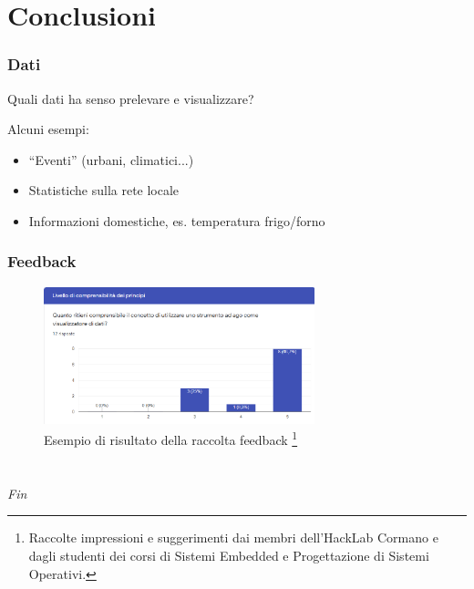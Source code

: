 \documentclass[aspectratio=169]{beamer}
\begin{document}
\section{Conclusioni}
\begin{frame}
\frametitle{Dati}
Quali dati ha senso prelevare e visualizzare?
\vspace{1cm}

Alcuni esempi:
\begin{itemize}
  \item ``Eventi'' (urbani, climatici...)
  \item Statistiche sulla rete locale
  \item Informazioni domestiche, es. temperatura frigo/forno
\end{itemize}
\end{frame}

\begin{frame}
\frametitle{Feedback}
\begin{figure}[h]
  \centering
  \includegraphics[width=0.7\textwidth]{esempioform}
  \caption{Esempio di risultato della raccolta feedback \footnote{Raccolte impressioni e suggerimenti dai membri dell'HackLab Cormano e dagli studenti dei corsi di Sistemi Embedded e Progettazione di Sistemi Operativi.}}
\end{figure}
\end{frame}

\section*{}
\begin{frame}{}
  \centering \Large
  \emph{Fin}
\end{frame}
\end{document}
